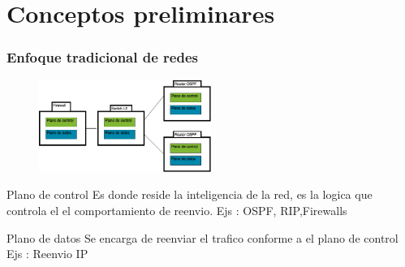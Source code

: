 \documentclass{beamer}
\begin{document}

\section{Conceptos preliminares} 
\frame{\tableofcontents[currentsection]}

\begin{frame}
\frametitle{Enfoque tradicional de redes} 



	\begin{figure}[H]
		\raggedright
		\includegraphics[width=0.5\textwidth, center]{imagenes/SDN-tradicional.png}
	\end{figure}

\hfill


\begin{block}{Plano de control}
Es donde reside la inteligencia de la red, es la logica que controla el el comportamiento de reenvio. Ejs : OSPF, RIP,Firewalls
\end{block}



\begin{block}{Plano de datos}
Se encarga de reenviar el trafico conforme a el plano de control Ejs : Reenvio IP
 
\end{block}


\end{frame}
\end{document}
